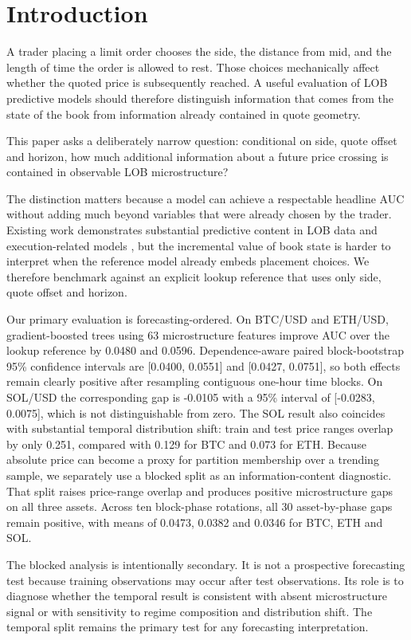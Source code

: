 \documentclass[11pt]{article}
\begin{document}
\section{Introduction}

A trader placing a limit order chooses the side, the distance from mid, and the
length of time the order is allowed to rest. Those choices mechanically affect
whether the quoted price is subsequently reached. A useful evaluation of LOB
predictive models should therefore distinguish information that comes from the
state of the book from information already contained in quote geometry.

This paper asks a deliberately narrow question: conditional on side, quote
offset and horizon, how much additional information about a future price
crossing is contained in observable LOB microstructure?

The distinction matters because a model can achieve a respectable headline AUC
without adding much beyond variables that were already chosen by the trader.
Existing work demonstrates substantial predictive content in LOB data and
execution-related models \citep{zhang2019,maglaras2022,arroyo2024}, but the
incremental value of book state is harder to interpret when the reference model
already embeds placement choices. We therefore benchmark against an explicit
lookup reference that uses only side, quote offset and horizon.

Our primary evaluation is forecasting-ordered. On BTC/USD and ETH/USD,
gradient-boosted trees using 63 microstructure features improve AUC over the
lookup reference by 0.0480 and 0.0596. Dependence-aware paired block-bootstrap
95\% confidence intervals are [0.0400, 0.0551] and [0.0427, 0.0751], so both
effects remain clearly positive after resampling contiguous one-hour time
blocks. On SOL/USD the corresponding gap is -0.0105 with a 95\% interval of
[-0.0283, 0.0075], which is not distinguishable from zero. The SOL result also
coincides with substantial temporal distribution shift: train and test price
ranges overlap by only 0.251, compared with 0.129 for BTC and 0.073 for ETH.
Because absolute price can become a proxy for partition membership over a
trending sample, we separately use a blocked split as an information-content
diagnostic. That split raises price-range overlap and produces positive
microstructure gaps on all three assets. Across ten block-phase rotations, all
30 asset-by-phase gaps remain positive, with means of 0.0473, 0.0382 and 0.0346
for BTC, ETH and SOL.

The blocked analysis is intentionally secondary. It is not a prospective
forecasting test because training observations may occur after test
observations. Its role is to diagnose whether the temporal result is consistent
with absent microstructure signal or with sensitivity to regime composition and
distribution shift. The temporal split remains the primary test for any
forecasting interpretation.
\end{document}
